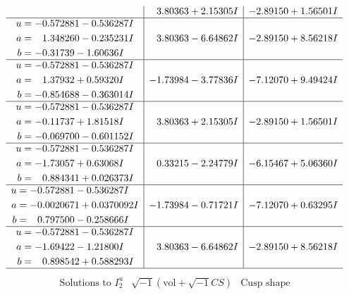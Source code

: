 \documentclass[1p]{elsarticle_modified}
\theoremstyle{definition}
\newcommand{\I}{\sqrt{-1}}
\begin{document}
$$\begin{array}{c|c|c}
 & \phantom{-}3.80363 + 2.15305 I & -2.89150 + 1.56501 I \\ \hline\begin{aligned}
u &= -0.572881 - 0.536287 I \\
a &= \phantom{-}1.348260 - 0.235231 I \\
b &= -0.31739 - 1.60636 I\end{aligned}
 & \phantom{-}3.80363 - 6.64862 I & -2.89150 + 8.56218 I \\ \hline\begin{aligned}
u &= -0.572881 - 0.536287 I \\
a &= \phantom{-}1.37932 + 0.59320 I \\
b &= -0.854688 - 0.363014 I\end{aligned}
 & -1.73984 - 3.77836 I & -7.12070 + 9.49424 I \\ \hline\begin{aligned}
u &= -0.572881 - 0.536287 I \\
a &= -0.11737 + 1.81518 I \\
b &= -0.069700 - 0.601152 I\end{aligned}
 & \phantom{-}3.80363 + 2.15305 I & -2.89150 + 1.56501 I \\ \hline\begin{aligned}
u &= -0.572881 - 0.536287 I \\
a &= -1.73057 + 0.63068 I \\
b &= \phantom{-}0.884341 + 0.026373 I\end{aligned}
 & \phantom{-}0.33215 - 2.24779 I & -6.15467 + 5.06360 I \\ \hline\begin{aligned}
u &= -0.572881 - 0.536287 I \\
a &= -0.0020671 + 0.0370092 I \\
b &= \phantom{-}0.797500 - 0.258666 I\end{aligned}
 & -1.73984 - 0.71721 I & -7.12070 + 0.63295 I \\ \hline\begin{aligned}
u &= -0.572881 - 0.536287 I \\
a &= -1.69422 - 1.21800 I \\
b &= \phantom{-}0.898542 + 0.588293 I\end{aligned}
 & \phantom{-}3.80363 - 6.64862 I & -2.89150 + 8.56218 I\\
 \hline 
 \end{array}$$\newpage$$\begin{array}{c|c|c}  
\text{Solutions to }I^u_{2}& \I (\text{vol} + \sqrt{-1}CS) & \text{Cusp shape}\\

\end{array}$$
\end{document}
